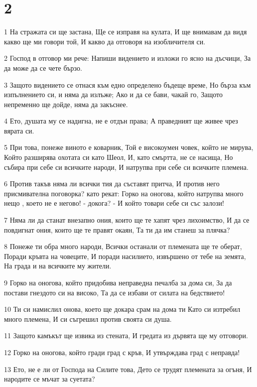 \chapter{2}

\par 1 На стражата си ще застана, Ще се изправя на кулата, И ще внимавам да видя какво ще ми говори той, И какво да отговоря на изобличителя си.
\par 2 Господ в отговор ми рече: Напиши видението и изложи го ясно на дъсчици, За да може да се чете бързо.
\par 3 Защото видението се отнася към едно определено бъдеще време, Но бърза към изпълнението си, и няма да излъже; Ако и да се бави, чакай го, Защото непременно ще дойде, няма да закъснее.
\par 4 Ето, душата му се надигна, не е отдън права; А праведният ще живее чрез вярата си.
\par 5 При това, понеже виното е коварник, Той е високоумен човек, който не мирува, Който разширява охотата си като Шеол, И, като смъртта, не се насища, Но събира при себе си всичките  народи,  И натрупва при себе си всичките племена.
\par 6 Против такъв няма ли всички тия да съставят притча, И против него присмивателна поговорка? като рекат: Горко на оногова, който натрупва много  нещо , което не е негово! - докога? - И който товари себе си със залози!
\par 7 Няма ли да станат внезапно ония, които ще те хапят чрез лихоимство, И да се повдигнат ония, които ще те правят окаян, Та ти да им станеш за плячка?
\par 8 Понеже ти обра много народи, Всички останали от племената ще те оберат, Поради кръвта на човеците, И поради насилието, извършено от тебе на земята, На града и на всичките му жители.
\par 9 Горко на оногова, който придобива неправедна печалба за дома си, За да постави гнездото си на високо, Та да се избави от силата на бедствието!
\par 10 Ти си намислил онова, което ще докара срам на дома ти Като си изтребил много племена, И си съгрешил против своята си душа.
\par 11 Защото камъкът ще извика из стената, И гредата из дървята ще му отговори.
\par 12 Горко на оногова, който гради град с кръв, И утвърждава град с неправда!
\par 13 Ето, не е ли от Господа на Силите това, Дето се трудят племената за огъня, И народите се мъчат за суетата?
